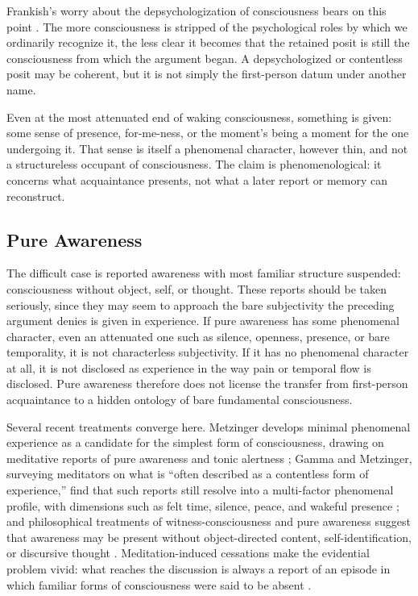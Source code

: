 Frankish's worry about the depsychologization of consciousness bears on this point \citep{frankish2021}. The more consciousness is stripped of the psychological roles by which we ordinarily recognize it, the less clear it becomes that the retained posit is still the consciousness from which the argument began. A depsychologized or contentless posit may be coherent, but it is not simply the first-person datum under another name.

Even at the most attenuated end of waking consciousness, something is given: some sense of presence, for-me-ness, or the moment's being a moment for the one undergoing it. That sense is itself a phenomenal character, however thin, and not a structureless occupant of consciousness. The claim is phenomenological: it concerns what acquaintance presents, not what a later report or memory can reconstruct.

\subsection{Pure Awareness}

The difficult case is reported awareness with most familiar structure suspended: consciousness without object, self, or thought. These reports should be taken seriously, since they may seem to approach the bare subjectivity the preceding argument denies is given in experience. If pure awareness has some phenomenal character, even an attenuated one such as silence, openness, presence, or bare temporality, it is not characterless subjectivity. If it has no phenomenal character at all, it is not disclosed as experience in the way pain or temporal flow is disclosed. Pure awareness therefore does not license the transfer from first-person acquaintance to a hidden ontology of bare fundamental consciousness.

Several recent treatments converge here. Metzinger develops minimal phenomenal experience as a candidate for the simplest form of consciousness, drawing on meditative reports of pure awareness and tonic alertness \citep{metzinger2020mpe}; Gamma and Metzinger, surveying meditators on what is ``often described as a contentless form of experience,'' find that such reports still resolve into a multi-factor phenomenal profile, with dimensions such as felt time, silence, peace, and wakeful presence \citep{gammaMetzinger2021}; and philosophical treatments of witness-consciousness and pure awareness suggest that awareness may be present without object-directed content, self-identification, or discursive thought \citep{albahari2006,albahari2009,thompson2014}. Meditation-induced cessations make the evidential problem vivid: what reaches the discussion is always a report of an episode in which familiar forms of consciousness were said to be absent \citep{laukkonen2023}.

